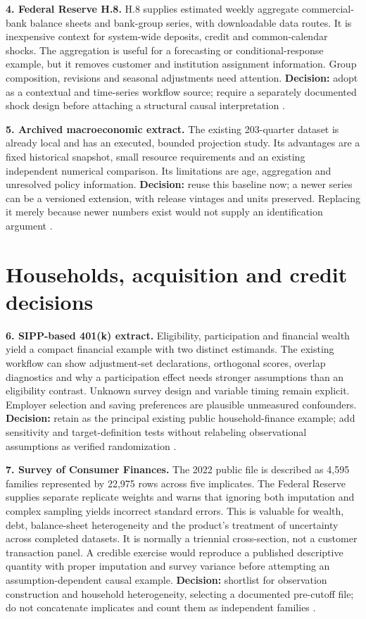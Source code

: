 \textbf{4. Federal Reserve H.8.} H.8 supplies estimated weekly aggregate
commercial-bank balance sheets and bank-group series, with downloadable
data routes. It is inexpensive context for system-wide deposits, credit
and common-calendar shocks. The aggregation is useful for a forecasting
or conditional-response example, but it removes customer and institution
assignment information. Group composition, revisions and seasonal
adjustments need attention. \textbf{Decision:} adopt as a contextual and
time-series workflow source; require a separately documented shock
design before attaching a structural causal interpretation
\citep{pd15_h8}.

\textbf{5. Archived macroeconomic extract.} The existing 203-quarter
dataset is already local and has an executed, bounded projection study.
Its advantages are a fixed historical snapshot, small resource
requirements and an existing independent numerical comparison. Its
limitations are age, aggregation and unresolved policy information.
\textbf{Decision:} reuse this baseline now; a newer series can be a
versioned extension, with release vintages and units preserved.
Replacing it merely because newer numbers exist would not supply an
identification argument \citep{public_macrodata_dynamic}.

\hypertarget{households-acquisition-and-credit-decisions}{%
\section{Households, acquisition and credit
decisions}\label{households-acquisition-and-credit-decisions}}

\textbf{6. SIPP-based 401(k) extract.} Eligibility, participation and
financial wealth yield a compact financial example with two distinct
estimands. The existing workflow can show adjustment-set declarations,
orthogonal scores, overlap diagnostics and why a participation effect
needs stronger assumptions than an eligibility contrast. Unknown survey
design and variable timing remain explicit. Employer selection and
saving preferences are plausible unmeasured confounders.
\textbf{Decision:} retain as the principal existing public
household-finance example; add sensitivity and target-definition tests
without relabeling observational assumptions as verified randomization
\citep{public401k}.

\textbf{7. Survey of Consumer Finances.} The 2022 public file is
described as 4,595 families represented by 22,975 rows across five
implicates. The Federal Reserve supplies separate replicate weights and
warns that ignoring both imputation and complex sampling yields
incorrect standard errors. This is valuable for wealth, debt,
balance-sheet heterogeneity and the product's treatment of uncertainty
across completed datasets. It is normally a triennial cross-section, not
a customer transaction panel. A credible exercise would reproduce a
published descriptive quantity with proper imputation and survey
variance before attempting an assumption-dependent causal example.
\textbf{Decision:} shortlist for observation construction and household
heterogeneity, selecting a documented pre-cutoff file; do not
concatenate implicates and count them as independent families
\citep{pd15_scf}.

